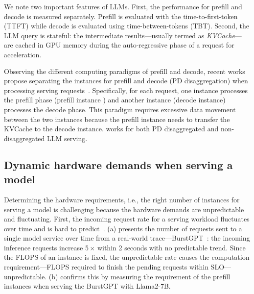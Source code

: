 We note two important features of LLMs.
First,
the performance for prefill and decode is measured separately.
Prefill is evaluated with the time-to-first-token (TTFT)
while decode is evaluated using time-between-tokens (TBT).
Second, the LLM query is stateful:
the intermediate results---usually termed as \emph{KVCache}---are cached in GPU memory
during the auto-regressive phase of a request for acceleration.

Observing the different computing paradigms of prefill and decode,
recent works propose separating the instances for prefill and decode (PD disaggregation)
when processing serving requests~\cite{DBLP:conf/isca/PatelCZSGMB24, DBLP:conf/osdi/ZhongLCHZL0024,DBLP:journals/corr/abs-2401-11181}.
Specifically, for each request, one instance processes the prefill phase (prefill instance )
and another instance (decode instance) processes the decode phase.
This paradigm requires excessive data movement between the two instances
because the prefill instance needs to transfer the KVCache to the decode instance.
{\sys} works for both PD disaggregated and non-disaggregated LLM serving.

  

\subsection{Dynamic hardware demands when serving a model}
\label{sec:problem-statement}

\noindent
Determining the hardware requirements, i.e.,
the right number of instances for serving a model is challenging
because the hardware demands are unpredictable and fluctuating.
First,
the incoming request rate for a serving workload fluctuates over time
and is hard to predict~\cite{DBLP:journals/corr/abs-2401-14351,DBLP:conf/usenix/ShahradFGCBCLTR20,DBLP:conf/nsdi/0025TKS23}.
{} (a) presents the number of requests sent to a single model service
over time from a real-world trace---BurstGPT~\cite{wang2024burstgpt}:
the incoming inference requests increase 5\,$\times$ within 2 seconds with no predictable trend.
Since the FLOPS of an instance is fixed, 
the unpredictable rate causes 
the computation requirement---FLOPS required to finish the pending
requests within SLO---unpredictable.
{} (b) confirms this by measuring the requirement 
of the prefill instances when serving the BurstGPT with Llama2-7B.

